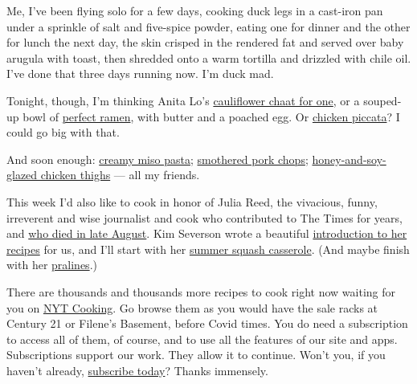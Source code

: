 Me, I've been flying solo for a few days, cooking duck legs in a
cast-iron pan under a sprinkle of salt and five-spice powder, eating one
for dinner and the other for lunch the next day, the skin crisped in the
rendered fat and served over baby arugula with toast, then shredded onto
a warm tortilla and drizzled with chile oil. I've done that three days
running now. I'm duck mad.

Tonight, though, I'm thinking Anita Lo's
\href{https://cooking.nytimes3xbfgragh.onion/recipes/1019622-cauliflower-chaat-for-one}{cauliflower
chaat for one}, or a souped-up bowl of
\href{https://cooking.nytimes3xbfgragh.onion/recipes/1016583-perfect-instant-ramen}{perfect
ramen}, with butter and a poached egg. Or
\href{https://cooking.nytimes3xbfgragh.onion/recipes/1019883-chicken-piccata}{chicken
piccata}? I could go big with that.

And soon enough:
\href{https://cooking.nytimes3xbfgragh.onion/recipes/1020979-five-ingredient-creamy-miso-pasta}{creamy
miso pasta};
\href{https://cooking.nytimes3xbfgragh.onion/recipes/1014390-smothered-pork-chops}{smothered
pork chops};
\href{https://cooking.nytimes3xbfgragh.onion/recipes/1019804-honey-and-soy-glazed-chicken-thighs}{honey-and-soy-glazed
chicken thighs} --- all my friends.

This week I'd also like to cook in honor of Julia Reed, the vivacious,
funny, irreverent and wise journalist and cook who contributed to The
Times for years, and
\href{https://www.nytimes3xbfgragh.onion/2020/09/04/dining/julia-reed-dead.html}{who
died in late August}. Kim Severson wrote a beautiful
\href{https://www.nytimes3xbfgragh.onion/2020/08/31/dining/julia-reed-recipes.html}{introduction
to her recipes} for us, and I'll start with her
\href{https://cooking.nytimes3xbfgragh.onion/recipes/11404-summer-squash-casserole}{summer
squash casserole}. (And maybe finish with her
\href{https://cooking.nytimes3xbfgragh.onion/recipes/1746-pralines}{pralines}.)

There are thousands and thousands more recipes to cook right now waiting
for you on \href{http://www.nytcooking.com/}{NYT Cooking}. Go browse
them as you would have the sale racks at Century 21 or Filene's
Basement, before Covid times. You do need a subscription to access all
of them, of course, and to use all the features of our site and apps.
Subscriptions support our work. They allow it to continue. Won't you, if
you haven't already,
\href{https://www.nytimes3xbfgragh.onion/subscription/cooking.html?campaignId=6XQHR}{subscribe
today}? Thanks immensely.

